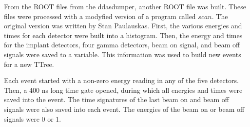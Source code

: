 From the ROOT files from the ddasdumper, another ROOT file was built.
These files were processed with a modyfied version of a program called $scan$.
The original version was written by Stan Paulauskas.
First, the various energies and times for each detector were built into a histogram.
Then, the energy and times for the implant detectors, four gamma detectors, beam on signal, and beam off signals were saved to a variable.
This information was used to build new events for a new TTree.

Each event started with a non-zero energy reading in any of the five detectors.
Then, a 400 ns long time gate opened, during which all energies and times were saved into the event.
The time signatures of the last beam on and beam off signals were also saved into each event.
The energies of the beam on or beam off signals were 0 or 1.
